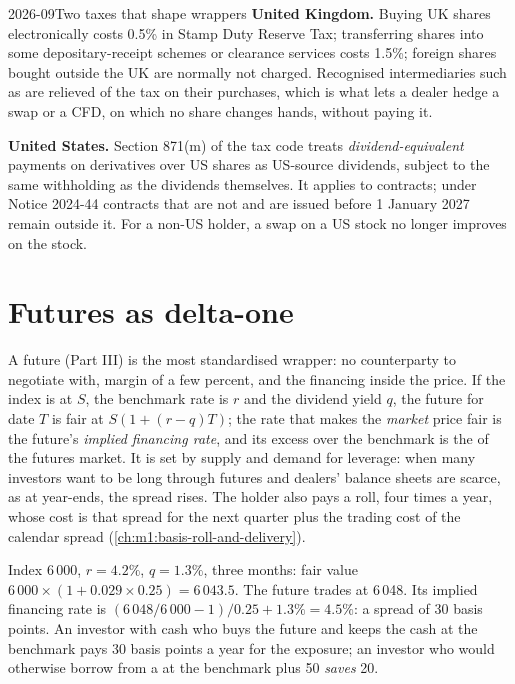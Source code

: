 \begin{dated}{2026-09}{Two taxes that shape wrappers}\label{dat:m1:delta-one-instruments:tax}
\textbf{United Kingdom.} Buying UK shares electronically costs 0.5\% in Stamp
Duty Reserve Tax; transferring shares into some depositary-receipt schemes or
clearance services costs 1.5\%; foreign shares bought outside the UK are
normally not charged. Recognised intermediaries such as  are
relieved of the tax on their purchases, which is what lets a dealer hedge a
swap or a CFD, on which no share changes hands, without paying it.

\textbf{United States.} Section 871(m) of the tax code treats
\emph{dividend-equivalent} payments on derivatives over US shares as US-source
dividends, subject to the same withholding as the dividends themselves. It
applies to  contracts; under Notice 2024-44 contracts that are not
 and are issued before 1 January 2027 remain outside it. For a
non-US holder, a swap on a US stock no longer improves on the stock.
\end{dated}

\section{Futures as delta-one}

A future (Part III) is the most standardised wrapper: no counterparty to
negotiate with, margin of a few percent, and the financing inside the price.
If the index is at $S$, the benchmark rate is $r$ and the dividend yield $q$,
the future for date $T$ is fair at $S(1+(r-q)T)$; the rate that makes the
\emph{market} price fair is the future's \emph{implied financing rate}, and
its excess over the benchmark is the  of the futures market.
It is set by supply and demand for leverage: when many investors want to be
long through futures and dealers' balance sheets are scarce, as at
year-ends, the spread rises. The holder also pays a roll, four times a year,
whose cost is that spread for the next quarter plus the trading cost of the
calendar spread (\cref{ch:m1:basis-roll-and-delivery}).

\begin{example}\label{ex:m1:delta-one-instruments:implied}
Index 6\,000, $r = 4.2\%$, $q = 1.3\%$, three months: fair value $6\,000
\times (1 + 0.029 \times 0.25) = 6\,043.5$. The future trades at 6\,048. Its
implied financing rate is $(6\,048/6\,000 - 1)/0.25 + 1.3\% = 4.5\%$: a
spread of 30 basis points. An investor with cash who buys the future and
keeps the cash at the benchmark pays 30 basis points a year for the
exposure; an investor who would otherwise borrow from a  at the
benchmark plus 50 \emph{saves} 20.
\end{example}

